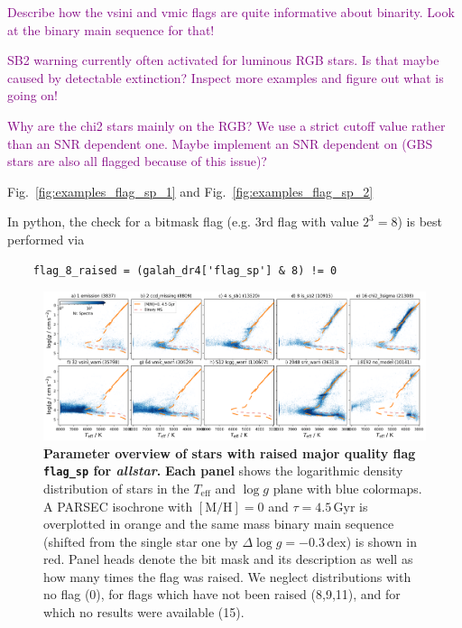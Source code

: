 \documentclass[
  journal=pasa,
  manuscript=research-paper, %
  year=2023,
  volume=37
]{cup-journal}
\newcommand{\SB}[1]{{\textcolor{purple}{#1}}}
\newcommand{\Teff}{$T_\mathrm{eff}$\xspace}
\newcommand{\logg}{$\log g$\xspace}
\begin{document}
\SB{Describe how the vsini and vmic flags are quite informative about binarity. Look at the binary main sequence for that!}

\SB{SB2 warning currently often activated for luminous RGB stars. Is that maybe caused by detectable extinction? Inspect more examples and figure out what is going on!}

\SB{Why are the chi2 stars mainly on the RGB? We use a strict cutoff value rather than an SNR dependent one. Maybe implement an SNR dependent on (GBS stars are also all flagged because of this issue)?}

Fig.~\ref{fig:examples_flag_sp_1} and Fig.~\ref{fig:examples_flag_sp_2}

In python, the check for a bitmask flag (e.g. 3rd flag with value $2^3 = 8$) is best performed via 
\begin{verbatim}
    flag_8_raised = (galah_dr4['flag_sp'] & 8) != 0
\end{verbatim}




\begin{figure}[ht]
 \centering
 \includegraphics[width=\textwidth]{figures/flag_sp_overview_allstar.png}
 \caption{\textbf{Parameter overview of stars with raised major quality flag \texttt{flag\_sp} for \textit{allstar}.}
 \textbf{Each panel} shows the logarithmic density distribution of stars in the \Teff and \logg plane with blue colormaps. A PARSEC isochrone with $\mathrm{[M/H]}=0$ and $\tau = 4.5\,\mathrm{Gyr}$ is overplotted in orange and the same mass binary main sequence (shifted from the single star one by $\Delta \log g = -0.3\,\mathrm{dex}$) is shown in red. Panel heads denote the bit mask and its description as well as how many times the flag was raised. We neglect distributions with no flag (0), for flags which have not been raised (8,9,11), and for which no results were available (15).} \label{fig:flag_sp_overview_allstar}
\end{figure}
\end{document}
